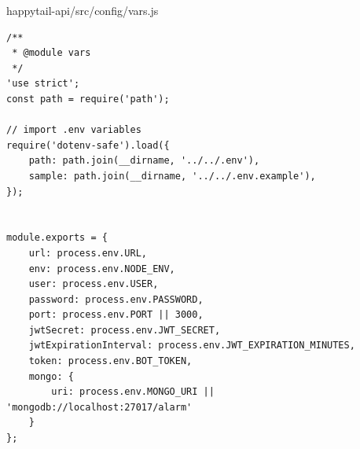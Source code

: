 \documentclass[12pt]{article}
\begin{document}
 
  \normalsize
 happytail-api/src/config/vars.js
 \footnotesize
\begin{verbatim}
/**
 * @module vars
 */
'use strict';
const path = require('path');

// import .env variables
require('dotenv-safe').load({
    path: path.join(__dirname, '../../.env'),
    sample: path.join(__dirname, '../../.env.example'),
});


module.exports = {
    url: process.env.URL,
    env: process.env.NODE_ENV,
    user: process.env.USER,
    password: process.env.PASSWORD,
    port: process.env.PORT || 3000,
    jwtSecret: process.env.JWT_SECRET,
    jwtExpirationInterval: process.env.JWT_EXPIRATION_MINUTES,
    token: process.env.BOT_TOKEN,
    mongo: {
        uri: process.env.MONGO_URI || 'mongodb://localhost:27017/alarm'
    }
};

 \end{verbatim}
 
\end{document}
